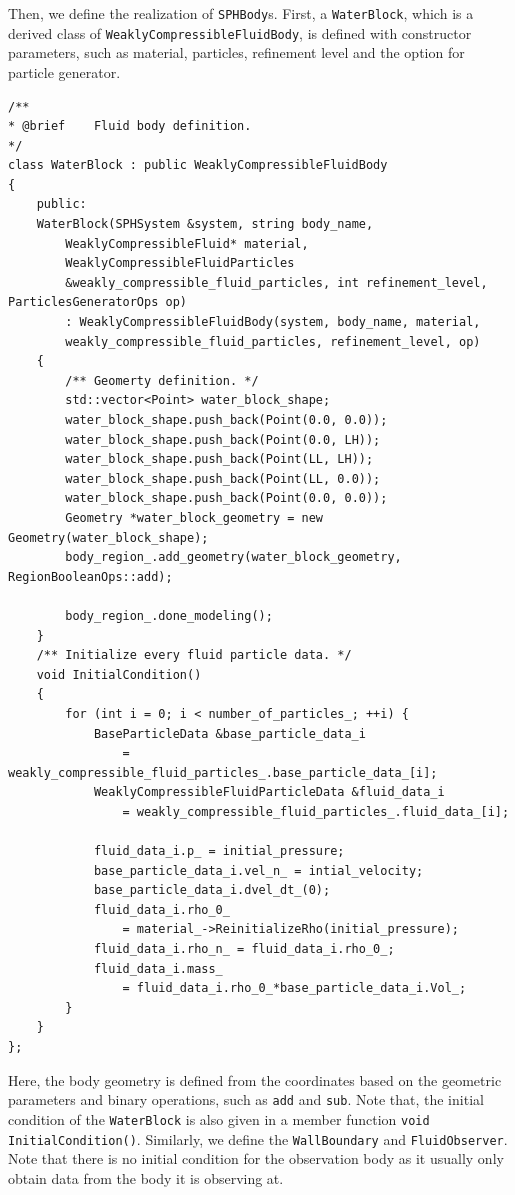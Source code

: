 \documentclass[12pt, a4paper,onecolumn]{article}
\begin{document}
Then, we define the realization of \texttt{SPHBody}s. 
First, a \texttt{WaterBlock}, which is a derived class of \texttt{WeaklyCompressibleFluidBody}, 
is defined with constructor parameters, such as material, particles, refinement level 
and the option for particle generator.
%
\begin{lstlisting}[basicstyle=\ttfamily\footnotesize]
/**
* @brief 	Fluid body definition.
*/
class WaterBlock : public WeaklyCompressibleFluidBody
{
	public:
	WaterBlock(SPHSystem &system, string body_name,
		WeaklyCompressibleFluid* material,
		WeaklyCompressibleFluidParticles
		&weakly_compressible_fluid_particles, int refinement_level, ParticlesGeneratorOps op)
		: WeaklyCompressibleFluidBody(system, body_name, material,
		weakly_compressible_fluid_particles, refinement_level, op)
	{
		/** Geomerty definition. */
		std::vector<Point> water_block_shape;
		water_block_shape.push_back(Point(0.0, 0.0));
		water_block_shape.push_back(Point(0.0, LH));
		water_block_shape.push_back(Point(LL, LH));
		water_block_shape.push_back(Point(LL, 0.0));
		water_block_shape.push_back(Point(0.0, 0.0));
		Geometry *water_block_geometry = new Geometry(water_block_shape);
		body_region_.add_geometry(water_block_geometry, RegionBooleanOps::add);
		
		body_region_.done_modeling();
	}
	/** Initialize every fluid particle data. */
	void InitialCondition()
	{
		for (int i = 0; i < number_of_particles_; ++i) {
			BaseParticleData &base_particle_data_i
				= weakly_compressible_fluid_particles_.base_particle_data_[i];
			WeaklyCompressibleFluidParticleData &fluid_data_i
				= weakly_compressible_fluid_particles_.fluid_data_[i];
			
			fluid_data_i.p_ = initial_pressure;
			base_particle_data_i.vel_n_ = intial_velocity;
			base_particle_data_i.dvel_dt_(0);
			fluid_data_i.rho_0_
				= material_->ReinitializeRho(initial_pressure);
			fluid_data_i.rho_n_ = fluid_data_i.rho_0_;
			fluid_data_i.mass_
				= fluid_data_i.rho_0_*base_particle_data_i.Vol_;
		}
	}
};
\end{lstlisting}
%
Here, the body geometry is defined from the coordinates 
based on the geometric parameters and binary operations, 
such as \texttt{add} and \texttt{sub}.
Note that, the initial condition of the \texttt{WaterBlock} 
is also given in a member function \texttt{void InitialCondition()}.
Similarly, we define the \texttt{WallBoundary} and \texttt{FluidObserver}.
Note that there is no initial condition for the observation body
as it usually only obtain data from the body it is observing at.
\end{document}

